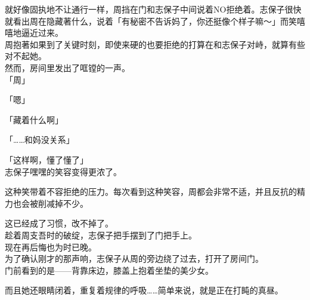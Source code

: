 就好像固执地不让通行一样，周挡在门和志保子中间说着NO拒绝着。志保子很快就看出周在隐藏著什么，说着「有秘密不告诉妈了，你还挺像个样子嘛～」而笑嘻嘻地逼近过来。\\

周抱著如果到了关键时刻，即使来硬的也要拒绝的打算在和志保子对峙，就算有些对不起她。\\

然而，房间里发出了哐镗的一声。\\

「周」

「嗯」

「藏着什么啊」

「……和妈没关系」

「这样啊，懂了懂了」\\

志保子嘿嘿的笑容变得更浓了。

这种笑带着不容拒绝的压力。每次看到这种笑容，周都会非常不适，并且反抗的精力也会被削减掉不少。

这已经成了习惯，改不掉了。\\

趁着周支吾时的破绽，志保子把手摆到了门把手上。\\

现在再后悔也为时已晚。\\

为了确认刚才的那声响，志保子从周的旁边绕了过去，打开了房间门。\\

门前看到的是——背靠床边，膝盖上抱着坐垫的美少女。

而且她还眼睛闭着，重复着规律的呼吸……简单来说，就是正在打盹的真昼。
